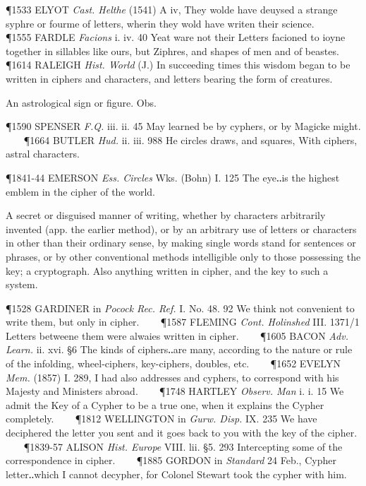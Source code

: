 \begin{description}[wide, labelwidth=!, labelindent=0pt]
\begin{myenumerate}
\P 1533 ELYOT  \textit{Cast. Helthe} (1541) A iv, They wolde have deuysed a strange syphre or fourme of letters, wherin they wold have writen their science.    
\P 1555 FARDLE  \textit{Facions} i. iv. 40 Yeat ware not their Letters facioned to ioyne together in sillables like ours, but Ziphres, and shapes of men and of beastes.    
\P 1614 RALEIGH  \textit{Hist. World} (J.) In succeeding times this wisdom began to be written in ciphers and characters, and letters bearing the form of creatures.

 An astrological sign or figure. Obs.

\P 1590 SPENSER  \textit{F.Q.} iii. ii. 45 May learned be by cyphers, or by Magicke might.    
\P 1664 BUTLER  \textit{Hud.} ii. iii. 988 He circles draws, and squares, With ciphers, astral characters.

\P 1841-44 EMERSON  \textit{Ess. Circles} Wks. (Bohn) I. 125 The eye‥is the highest emblem in the cipher of the world.

 A secret or disguised manner of writing, whether by characters arbitrarily invented (app. the earlier method), or by an arbitrary use of letters or characters in other than their ordinary sense, by making single words stand for sentences or phrases, or by other conventional methods intelligible only to those possessing the key; a cryptograph. Also anything written in cipher, and the key to such a system.

\P 1528 GARDINER in  \textit{Pocock Rec. Ref.} I. No. 48. 92 We think not convenient to write them, but only in cipher.    
\P 1587 FLEMING  \textit{Cont. Holinshed} III. 1371/1 Letters betweene them were alwaies written in cipher.    
\P 1605 BACON  \textit{Adv. Learn.} ii. xvi. §6 The kinds of ciphers‥are many, according to the nature or rule of the infolding, wheel-ciphers, key-ciphers, doubles, etc.    
\P 1652 EVELYN  \textit{Mem.} (1857) I. 289, I had also addresses and cyphers, to correspond with his Majesty and Ministers abroad.    
\P 1748 HARTLEY  \textit{Observ. Man} i. i. 15 We admit the Key of a Cypher to be a true one, when it explains the Cypher completely.    
\P 1812 WELLINGTON in  \textit{Gurw. Disp.} IX. 235 We have deciphered the letter you sent and it goes back to you with the key of the cipher.    
\P 1839-57 ALISON  \textit{Hist. Europe} VIII. lii. §5. 293 Intercepting some of the correspondence in cipher.    
\P 1885 GORDON in  \textit{Standard} 24 Feb., Cypher letter‥which I cannot decypher, for Colonel Stewart took the cypher with him.


\end{myenumerate}
\end{description}
